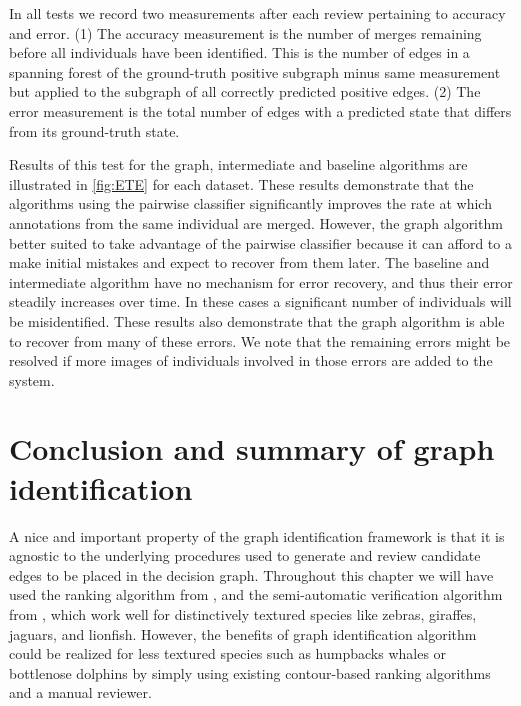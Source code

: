     In all tests we record two measurements after each review pertaining to accuracy and error. (1) The accuracy
    measurement is the number of merges remaining before all individuals have been identified. This is the number of
    edges in a spanning forest of the ground-truth positive subgraph minus same measurement but applied to the subgraph
    of all correctly predicted positive edges. (2) The error measurement is the total number of edges with a predicted
    state that differs from its ground-truth state.

    Results of this test for the graph, intermediate and baseline algorithms are illustrated in \cref{fig:ETE} for each
    dataset. These results demonstrate that the algorithms using the pairwise classifier significantly improves the rate
    at which annotations from the same individual are merged. However, the graph algorithm better suited to take
    advantage of the pairwise classifier because it can afford to a make initial mistakes and expect to recover from
    them later. The baseline and intermediate algorithm have no mechanism for error recovery, and thus their error
    steadily increases over time. In these cases a significant number of individuals will be misidentified. These
    results also demonstrate that the graph algorithm is able to recover from many of these errors. We note that the
    remaining errors might be resolved if more images of individuals involved in those errors are added to the system.

 
\section{Conclusion and summary of graph identification}\label{sec:graphconclusion}

A nice and important property of the graph identification framework is that it is agnostic to the underlying procedures
used to generate and review candidate edges to be placed in the decision graph. Throughout this chapter we will have
used the ranking algorithm from , and the semi-automatic verification algorithm from
, which work well for distinctively textured species like zebras, giraffes, jaguars, and lionfish.
However, the benefits of graph identification algorithm could be realized for less textured species such as humpbacks
whales or bottlenose dolphins by simply using existing contour-based ranking algorithms and a manual reviewer.

